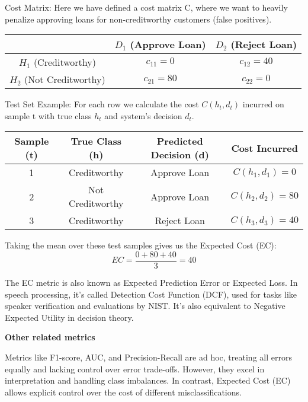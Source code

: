 Cost Matrix: Here we have defined a cost matrix C, where we want to heavily penalize approving loans for non-creditworthy customers (false positives).

\begin{center}
\begin{tabular}{|c|c|c|}
\hline
 & $D_1$ (Approve Loan) & $D_2$ (Reject Loan) \\
\hline
$H_1$ (Creditworthy) & $c_{11} =  0$ & $c_{12} = 40$ \\
\hline
$H_2$ (Not Creditworthy) & $c_{21} = 80$ & $c_{22} =  0$ \\
\hline
\end{tabular}
\end{center}

Test Set Example: For each row we calculate the cost $C(h_t, d_t)$ incurred on sample t with true class $h_t$ and system’s decision $d_t$.

\begin{center}
\begin{tabular}{|c|c|c|c|}
\hline
Sample (t)& True Class (h) & Predicted Decision (d) & Cost Incurred \\
\hline
1 & Creditworthy & Approve Loan & $C(h_1, d_1) = 0$ \\
\hline
2 & Not Creditworthy & Approve Loan & $C(h_2, d_2) = 80$ \\
\hline
3 & Creditworthy & Reject Loan & $C(h_3, d_3) = 40$ \\
\hline
\end{tabular}
\end{center}

Taking the mean over these test samples gives us the Expected Cost (EC):
\[
EC = \frac{0 + 80 + 40}{3} = 40
\]

{
    The EC metric is also known as Expected Prediction Error or Expected Loss. In speech processing, it’s called Detection Cost Function (DCF), used for tasks like speaker verification and evaluations by NIST. It's also equivalent to Negative Expected Utility in decision theory.
}

\textbf{Other related metrics}

Metrics like F1-score, AUC, and Precision-Recall are ad hoc, treating all errors equally and lacking control over error trade-offs. However, they excel in interpretation and handling class imbalances. In contrast, Expected Cost (EC) allows explicit control over the cost of different misclassifications.
